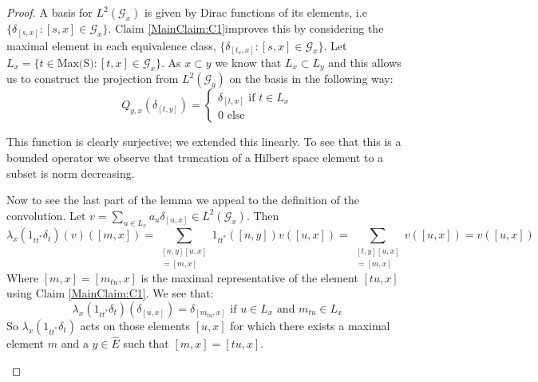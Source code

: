 \documentclass[11pt]{amsart}
\theoremstyle{plain}
\theoremstyle{definition}%
\theoremstyle{remark}%
\begin{document}
\begin{proof}
A basis for $L^{2}(\mathcal{G}_{x})$ is given by Dirac functions of its elements, i.e $\lbrace \delta_{[s,x]} : [s,x] \in \mathcal{G}_{x} \rbrace$. Claim \ref{MainClaim:C1}improves this by considering the maximal element in each equivalence class, $\lbrace \delta_{[t_{s},x]} : [s,x] \in \mathcal{G}_{x} \rbrace$. Let $L_{x} = \lbrace t \in \text{Max(S)} : [t,x] \in \mathcal{G}_{x} \rbrace$. As $x \subset y$ we know that $L_{x} \subset L_{y}$ and this  allows us to construct the projection from $L^{2}(\mathcal{G}_{y})$ on the basis in the following way:
\begin{equation}
Q_{y,x}(\delta_{[t,y]})= \begin{cases} \delta_{[t,x]} \mbox{ if } t \in L_{x} \\ 0 \mbox{ else} \end{cases}  
\end{equation}

This function is clearly surjective; we extended this linearly. To see that this is a bounded operator we observe that truncation of a Hilbert space element to a subset is norm decreasing.

Now to see the last part of the lemma we appeal to the definition of the convolution. Let $v = \sum_{u \in L_{x}} a_{u}\delta_{[u,x]} \in L^{2}(\mathcal{G}_{x})$. Then
\begin{equation*}
\lambda_{x}(1_{tt^{*}}\delta_{t})(v)([m,x])=\sum_{\substack{[n,y][u,x]\\=[m,x]}} 1_{tt^{*}}([n,y])v([u,x])=\sum_{\substack{[t,y][u,x]\\=[m,x]}}v([u,x])=v([u,x])
\end{equation*}
Where $[m,x]=[m_{tu},x]$ is the maximal representative of the element $[tu,x]$ using Claim \ref{MainClaim:C1}. We see that:
\begin{equation*}
\lambda_{x}(1_{tt^{*}}\delta_{t})(\delta_{[u,x]})= \delta_{[m_{tu},x]} \mbox{ if } u\in L_{x} \mbox{ and } m_{tu} \in L_{x}
\end{equation*}
So $\lambda_{x}(1_{tt^{*}}\delta_{t})$ acts on those elements $[u,x]$ for which there exists a maximal element $m$ and a $y \in \widehat{E}$ such that $[m,x]=[tu,x]$. 

\begin{figure}\label{fig:F1}






\end{figure}
\end{proof}
\end{document}
